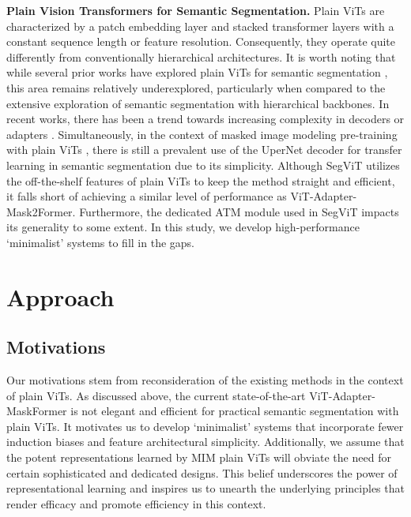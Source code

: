 \documentclass{article} \usepackage{iclr2024_conference,times}
\begin{document}
\textbf{Plain Vision Transformers for Semantic Segmentation.} Plain ViTs are characterized by a patch embedding layer and stacked transformer layers with a constant sequence length or feature resolution. Consequently, they operate quite differently from conventionally hierarchical architectures. It is worth noting that while several prior works have explored plain ViTs for semantic segmentation \citep{zheng2021rethinking,ranftl2021vision,strudel2021segmenter,lin2023structtoken,chen2023vision,zhang2022segvit}, this area remains relatively underexplored, particularly when compared to the extensive exploration of semantic segmentation with hierarchical backbones.
In recent works, there has been a trend towards increasing complexity in decoders or adapters \citep{lin2023structtoken,chen2023vision}. Simultaneously, in the context of masked image modeling pre-training with plain ViTs \citep{bao2022beit,he2022masked,chen2023context,peng2022beit}, there is still a prevalent use of the UperNet decoder for transfer learning in semantic segmentation due to its simplicity. Although SegViT utilizes the off-the-shelf features of plain ViTs to keep the method straight and efficient, it falls short of achieving a similar level of performance as ViT-Adapter-Mask2Former. Furthermore, the dedicated ATM module used in SegViT impacts its generality to some extent. In this study, we develop high-performance `minimalist' systems to fill in the gaps.

\section{Approach}


\subsection{Motivations}

Our motivations stem from reconsideration of the existing methods in the context of plain ViTs. As discussed above, the current state-of-the-art ViT-Adapter-MaskFormer is not elegant and efficient for practical semantic segmentation with plain ViTs. It motivates us to develop `minimalist' systems that incorporate fewer induction biases and feature architectural simplicity. Additionally, we assume that the potent representations learned by MIM plain ViTs will obviate the need for certain sophisticated and dedicated designs. This belief underscores the power of representational learning and inspires us to unearth the underlying principles that render efficacy and promote efficiency in this context.
\end{document}
